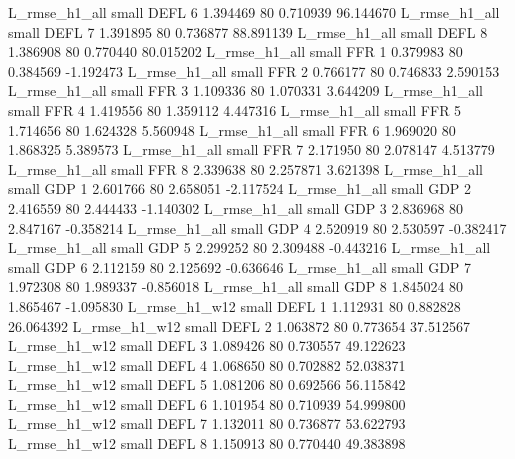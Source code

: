  L_rmse_h1_all      small     DEFL                 6 1.394469 80       0.710939          96.144670
 L_rmse_h1_all      small     DEFL                 7 1.391895 80       0.736877          88.891139
 L_rmse_h1_all      small     DEFL                 8 1.386908 80       0.770440          80.015202
 L_rmse_h1_all      small      FFR                 1 0.379983 80       0.384569          -1.192473
 L_rmse_h1_all      small      FFR                 2 0.766177 80       0.746833           2.590153
 L_rmse_h1_all      small      FFR                 3 1.109336 80       1.070331           3.644209
 L_rmse_h1_all      small      FFR                 4 1.419556 80       1.359112           4.447316
 L_rmse_h1_all      small      FFR                 5 1.714656 80       1.624328           5.560948
 L_rmse_h1_all      small      FFR                 6 1.969020 80       1.868325           5.389573
 L_rmse_h1_all      small      FFR                 7 2.171950 80       2.078147           4.513779
 L_rmse_h1_all      small      FFR                 8 2.339638 80       2.257871           3.621398
 L_rmse_h1_all      small      GDP                 1 2.601766 80       2.658051          -2.117524
 L_rmse_h1_all      small      GDP                 2 2.416559 80       2.444433          -1.140302
 L_rmse_h1_all      small      GDP                 3 2.836968 80       2.847167          -0.358214
 L_rmse_h1_all      small      GDP                 4 2.520919 80       2.530597          -0.382417
 L_rmse_h1_all      small      GDP                 5 2.299252 80       2.309488          -0.443216
 L_rmse_h1_all      small      GDP                 6 2.112159 80       2.125692          -0.636646
 L_rmse_h1_all      small      GDP                 7 1.972308 80       1.989337          -0.856018
 L_rmse_h1_all      small      GDP                 8 1.845024 80       1.865467          -1.095830
 L_rmse_h1_w12      small     DEFL                 1 1.112931 80       0.882828          26.064392
 L_rmse_h1_w12      small     DEFL                 2 1.063872 80       0.773654          37.512567
 L_rmse_h1_w12      small     DEFL                 3 1.089426 80       0.730557          49.122623
 L_rmse_h1_w12      small     DEFL                 4 1.068650 80       0.702882          52.038371
 L_rmse_h1_w12      small     DEFL                 5 1.081206 80       0.692566          56.115842
 L_rmse_h1_w12      small     DEFL                 6 1.101954 80       0.710939          54.999800
 L_rmse_h1_w12      small     DEFL                 7 1.132011 80       0.736877          53.622793
 L_rmse_h1_w12      small     DEFL                 8 1.150913 80       0.770440          49.383898
